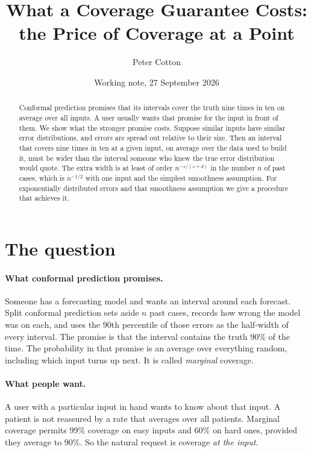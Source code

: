 \documentclass[11pt]{article}
\title{What a Coverage Guarantee Costs:\\ the Price of Coverage at a Point}
\author{Peter Cotton}
\date{Working note, 27 September 2026}
\theoremstyle{definition}
\theoremstyle{remark}
\begin{document}
\maketitle

\begin{abstract}
Conformal prediction promises that its intervals cover the truth nine times in ten on
average over all inputs. A user usually wants that promise for the input in front of them.
We show what the stronger promise costs. Suppose similar inputs have similar error
distributions, and errors are spread out relative to their size. Then an interval that
covers nine times in ten at a given input, on average over the data used to build it, must
be wider than the interval someone who knew the true error distribution would quote. The
extra width is at least of order $n^{-s/(s+d)}$ in the number $n$ of past cases, which is
$n^{-1/2}$ with one input and the simplest smoothness assumption. For exponentially
distributed errors and that smoothness assumption we give a procedure that achieves it.
\end{abstract}

\section{The question}

\paragraph{What conformal prediction promises.}
Someone has a forecasting model and wants an interval around each forecast. Split conformal
prediction sets aside $n$ past cases, records how wrong the model was on each, and uses the
$90$th percentile of those errors as the half-width of every interval. The promise is that
the interval contains the truth $90\%$ of the time. The probability in that promise is an
average over everything random, including which input turns up next. It is called
\emph{marginal} coverage.

\paragraph{What people want.}
A user with a particular input in hand wants to know about that input. A patient is not
reassured by a rate that averages over all patients. Marginal coverage permits $99\%$
coverage on easy inputs and $60\%$ on hard ones, provided they average to $90\%$. So the
natural request is coverage \emph{at the input}.
\end{document}
